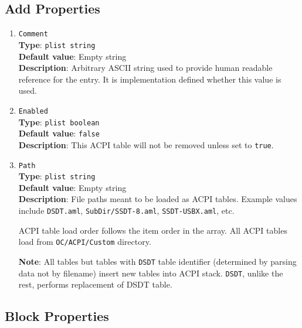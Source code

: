 \documentclass[]{article}
\begin{document}
\subsection{Add Properties}\label{acpipropsadd}

\begin{enumerate}
\item
  \texttt{Comment}\\
  \textbf{Type}: \texttt{plist\ string}\\
  \textbf{Default value}: Empty string\\
  \textbf{Description}: Arbitrary ASCII string used to provide human readable
  reference for the entry. It is implementation defined whether this value is
  used.

\item
  \texttt{Enabled}\\
  \textbf{Type}: \texttt{plist\ boolean}\\
  \textbf{Default value}: \texttt{false}\\
  \textbf{Description}: This ACPI table will not be removed unless set to
  \texttt{true}.

\item
  \texttt{Path}\\
  \textbf{Type}: \texttt{plist\ string}\\
  \textbf{Default value}: Empty string\\
  \textbf{Description}: File paths meant to be loaded as ACPI tables.
  Example values include \texttt{DSDT.aml}, \texttt{SubDir/SSDT-8.aml},
  \texttt{SSDT-USBX.aml}, etc.

  ACPI table load order follows the item order in the array. All ACPI tables
  load from \texttt{OC/ACPI/Custom} directory.

  \textbf{Note}: All tables but tables with \texttt{DSDT} table identifier
  (determined by parsing data not by filename) insert new tables into ACPI stack.
  \texttt{DSDT}, unlike the rest, performs replacement of DSDT table.

\end{enumerate}

\subsection{Block Properties}\label{acpipropsblock}
\end{document}
